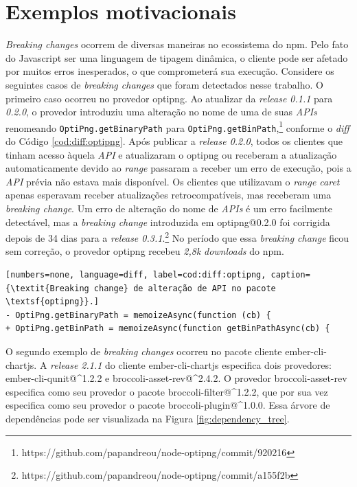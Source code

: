 \chapter{Exemplos motivacionais}
\label{cap:exemplos}

\textit{Breaking changes} ocorrem de diversas maneiras no ecossistema do \textsf{npm}. Pelo fato do \textsf{Javascript} ser uma linguagem de tipagem dinâmica, o cliente pode ser afetado por muitos erros inesperados, o que comprometerá sua execução. Considere os seguintes casos de \textit{breaking changes} que foram detectados nesse trabalho. O primeiro caso ocorreu no provedor \textsf{optipng}. Ao atualizar da \textit{release 0.1.1} para \textit{0.2.0}, o provedor introduziu uma alteração no nome de uma de suas \textit{APIs} renomeando \texttt{OptiPng.getBinaryPath} para \texttt{OptiPng.getBinPath},\footnote{https://github.com/papandreou/node-optipng/commit/920216} conforme o \textit{diff} do Código \ref{cod:diff:optipng}. Após publicar a \textit{release 0.2.0}, todos os clientes que tinham acesso àquela \textit{API} e atualizaram o \textsf{optipng} ou receberam a atualização automaticamente devido ao \textit{range} passaram a receber um erro de execução, pois a \textit{API} prévia não estava mais disponível. Os clientes que utilizavam o \textit{range caret} apenas esperavam receber atualizações retrocompatíveis, mas receberam uma \textit{breaking change}. Um erro de alteração do nome de \textit{APIs} é um erro facilmente detectável, mas a \textit{breaking change} introduzida em \textsf{optipng@0.2.0} foi corrigida depois de 34 dias para a \textit{release 0.3.1}.\footnote{https://github.com/papandreou/node-optipng/commit/a155f2b} No período que essa \textit{breaking change} ficou sem correção, o provedor \textsf{optipng} recebeu \textit{2,8k} \textit{downloads} do \textsf{npm}.

\vspace{0.4cm}
\begin{lstlisting}[numbers=none, language=diff, label=cod:diff:optipng, caption={\textit{Breaking change} de alteração de API no pacote \textsf{optipng}}.]
- OptiPng.getBinaryPath = memoizeAsync(function (cb) {
+ OptiPng.getBinPath = memoizeAsync(function getBinPathAsync(cb) {
\end{lstlisting}

O segundo exemplo de \textit{breaking changes} ocorreu no pacote cliente \textsf{ember-cli-chartjs}. A \textit{release 2.1.1} do cliente \textsf{ember-cli-chartjs} especifica dois provedores: \textsf{ember-cli-qunit@\textasciicircum1.2.2} e \textsf{broccoli-asset-rev@\textasciicircum2.4.2}. O provedor \textsf{broccoli-asset-rev} especifica como seu provedor o pacote \textsf{broccoli-filter@\textasciicircum1.2.2}, que por sua vez especifica como seu provedor o pacote \textsf{broccoli-plugin@\textasciicircum1.0.0}. Essa árvore de dependências pode ser visualizada na Figura \ref{fig:dependency_tree}.

